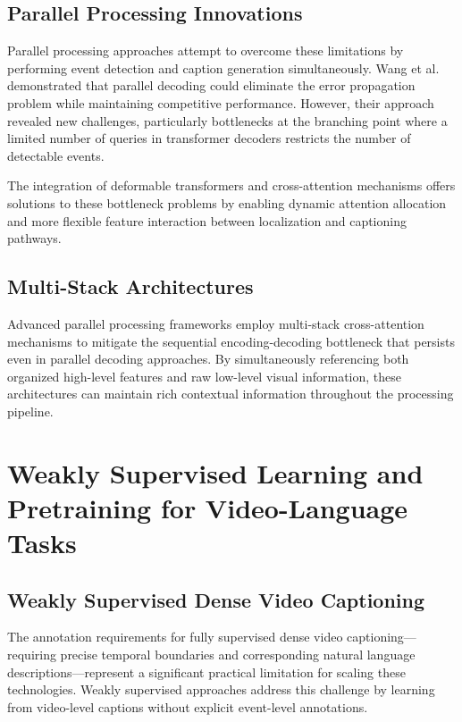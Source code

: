 \subsection{Parallel Processing Innovations}
Parallel processing approaches attempt to overcome these limitations by performing event detection and caption generation simultaneously.
Wang et al. \cite{Wang2021-zi} demonstrated that parallel decoding could eliminate the error propagation problem while maintaining competitive performance.
However, their approach revealed new challenges, particularly bottlenecks at the branching point where a limited number of queries in transformer decoders restricts the number of detectable events.

The integration of deformable transformers \cite{zhu2021deformable} and cross-attention mechanisms offers solutions to these bottleneck problems by enabling dynamic attention allocation and more flexible feature interaction between localization and captioning pathways.

\subsection{Multi-Stack Architectures}
Advanced parallel processing frameworks employ multi-stack cross-attention mechanisms to mitigate the sequential encoding-decoding bottleneck that persists even in parallel decoding approaches.
By simultaneously referencing both organized high-level features and raw low-level visual information, these architectures can maintain rich contextual information throughout the processing pipeline.

\section{Weakly Supervised Learning and Pretraining for Video-Language Tasks}
\label{sec:weakly_supervised_pretraining}

\subsection{Weakly Supervised Dense Video Captioning}
The annotation requirements for fully supervised dense video captioning—requiring precise temporal boundaries and corresponding natural language descriptions—represent a significant practical limitation for scaling these technologies.
Weakly supervised approaches \cite{Duan2018-qf,Shen2017-gx,Chen2021-sv} address this challenge by learning from video-level captions without explicit event-level annotations.

